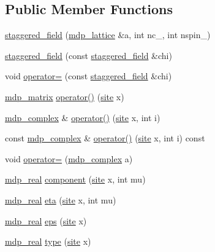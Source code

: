 \subsection*{Public Member Functions}
\begin{DoxyCompactItemize}
\item 
\hyperlink{classstaggered__field_acc7d5a171caf8bda9d0a904c6672432d}{staggered\+\_\+field} (\hyperlink{classmdp__lattice}{mdp\+\_\+lattice} \&a, int nc\+\_\+, int nspin\+\_)
\item 
\hyperlink{classstaggered__field_a22b5b7f7d050f6356451df02356f181d}{staggered\+\_\+field} (const \hyperlink{classstaggered__field}{staggered\+\_\+field} \&chi)
\item 
void \hyperlink{classstaggered__field_a5320371c9d4b87255c578e5b41684e48}{operator=} (const \hyperlink{classstaggered__field}{staggered\+\_\+field} \&chi)
\item 
\hyperlink{classmdp__matrix}{mdp\+\_\+matrix} \hyperlink{classstaggered__field_aa881451872889aa0b6c716c01f3fabb7}{operator()} (\hyperlink{mdp__compatibility__macros_8h_aa6f1179c424e48adef1cedf7c436eb75}{site} x)
\item 
\hyperlink{classmdp__complex}{mdp\+\_\+complex} \& \hyperlink{classstaggered__field_a32b4553845d0b7f92f99f07e0fbeb64a}{operator()} (\hyperlink{mdp__compatibility__macros_8h_aa6f1179c424e48adef1cedf7c436eb75}{site} x, int i)
\item 
const \hyperlink{classmdp__complex}{mdp\+\_\+complex} \& \hyperlink{classstaggered__field_a212b5ab1660981c1403604216d378f44}{operator()} (\hyperlink{mdp__compatibility__macros_8h_aa6f1179c424e48adef1cedf7c436eb75}{site} x, int i) const
\item 
void \hyperlink{classstaggered__field_ac3fee1898eaa4198744c5bc0cc969e2e}{operator=} (\hyperlink{classmdp__complex}{mdp\+\_\+complex} a)
\item 
\hyperlink{mdp__global__vars_8h_a69d96b74c791e0bbdb888b3913a69450}{mdp\+\_\+real} \hyperlink{classstaggered__field_a613e227e2cc092c103ce431000fd4b53}{component} (\hyperlink{mdp__compatibility__macros_8h_aa6f1179c424e48adef1cedf7c436eb75}{site} x, int mu)
\item 
\hyperlink{mdp__global__vars_8h_a69d96b74c791e0bbdb888b3913a69450}{mdp\+\_\+real} \hyperlink{classstaggered__field_a2f865e7dbd982109e584d26687f5340d}{eta} (\hyperlink{mdp__compatibility__macros_8h_aa6f1179c424e48adef1cedf7c436eb75}{site} x, int mu)
\item 
\hyperlink{mdp__global__vars_8h_a69d96b74c791e0bbdb888b3913a69450}{mdp\+\_\+real} \hyperlink{classstaggered__field_ae89b67366b3566c3c8a89d3303dc1d62}{eps} (\hyperlink{mdp__compatibility__macros_8h_aa6f1179c424e48adef1cedf7c436eb75}{site} x)
\item 
\hyperlink{mdp__global__vars_8h_a69d96b74c791e0bbdb888b3913a69450}{mdp\+\_\+real} \hyperlink{classstaggered__field_a5e53f3e9e5c268dde3e3f2eb9e64befa}{type} (\hyperlink{mdp__compatibility__macros_8h_aa6f1179c424e48adef1cedf7c436eb75}{site} x)
\end{DoxyCompactItemize}

